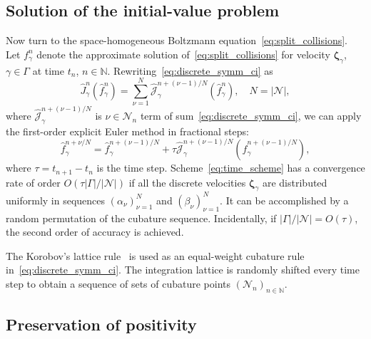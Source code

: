 \documentclass[review]{elsarticle}
\newcommand{\bzeta}{\boldsymbol{\zeta}}
\newcommand{\Nu}{\mathcal{N}}
\newcommand{\OO}[1]{O(#1)}
\begin{document}
\subsection{Solution of the initial-value problem}

Now turn to the space-homogeneous Boltzmann equation~\eqref{eq:split_collisions}.
Let \(f_\gamma^n\) denote the approximate solution of~\eqref{eq:split_collisions}
for velocity \(\bzeta_\gamma\), \(\gamma\in\Gamma\) at time \(t_n\), \(n\in\mathbb{N}\).
Rewriting~\eqref{eq:discrete_symm_ci} as
\begin{equation}\label{eq:discrete_short_ci}
    \hat{J}_\gamma^n\left(\hat{f}_\gamma^n\right) =
        \sum_{\nu=1}^N \hat{\mathscr{J}}_\gamma^{n+(\nu-1)/N} \left(\hat{f}_\gamma^n\right), \quad
    N=|\Nu|,
\end{equation}
where \(\hat{\mathscr{J}}_\gamma^{n+(\nu-1)/N}\) is \(\nu\in\Nu_n\) term of sum~\eqref{eq:discrete_symm_ci},
we can apply the first-order explicit Euler method in fractional steps:
\begin{equation}\label{eq:time_scheme}
    \hat{f}_\gamma^{n+\nu/N} = \hat{f}_\gamma^{n+(\nu-1)/N} + \tau \hat{\mathscr{J}}_\gamma^{n+(\nu-1)/N}
    \left(\hat{f}_\gamma^{n+(\nu-1)/N}\right),
\end{equation}
where \(\tau = t_{n+1} - t_n\) is the time step.
Scheme~\eqref{eq:time_scheme} has a convergence rate of order \(\OO{\tau|\Gamma|/|\Nu|}\)
if all the discrete velocities \(\bzeta_\gamma\) are distributed uniformly
in sequences \((\alpha_\nu)_{\nu=1}^N\) and \((\beta_\nu)_{\nu=1}^N\).
It can be accomplished by a random permutation of the cubature sequence.
Incidentally, if \(|\Gamma|/|\Nu| = \OO{\tau}\), the second order of accuracy is achieved.

The Korobov's lattice rule~\citep{Korobov1959, Sloan1994} is used as
an equal-weight cubature rule in~\eqref{eq:discrete_symm_ci}.
The integration lattice is randomly shifted every time step
to obtain a sequence of sets of cubature points \((\Nu_n)_{n\in\mathbb{N}}\).

\subsection{Preservation of positivity}
\end{document}
